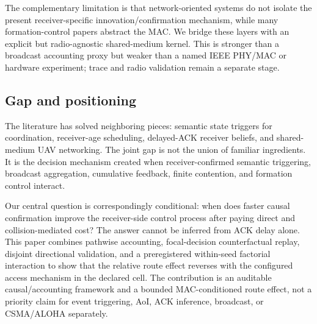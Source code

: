 The complementary limitation is that network-oriented systems do not isolate
the present receiver-specific innovation/confirmation mechanism, while many
formation-control papers abstract the MAC. We bridge these layers with an
explicit but radio-agnostic shared-medium kernel. This is stronger than a
broadcast accounting proxy but weaker than a named IEEE PHY/MAC or hardware
experiment; trace and radio validation remain a separate stage.

\subsection{Gap and positioning}

The literature has solved neighboring pieces: semantic state triggers for
coordination, receiver-age scheduling, delayed-ACK receiver beliefs, and
shared-medium UAV networking. The joint gap is not the union of familiar
ingredients. It is the decision mechanism created when receiver-confirmed
semantic triggering, broadcast aggregation, cumulative feedback, finite
contention, and formation control interact.

Our central question is correspondingly conditional: when does faster causal
confirmation improve the receiver-side control process after paying direct and
collision-mediated cost? The answer cannot be inferred from ACK delay alone.
This paper combines pathwise accounting, focal-decision counterfactual replay,
disjoint directional validation, and a preregistered within-seed factorial
interaction to show that the relative route effect reverses with the configured
access mechanism in the declared cell. The contribution is an auditable
causal/accounting framework and a bounded MAC-conditioned route effect, not a priority claim
for event triggering, AoI, ACK inference, broadcast, or CSMA/ALOHA separately.
